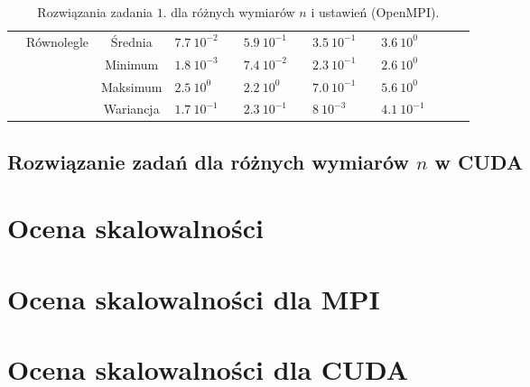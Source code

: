 \documentclass[11pt, a4paper, oneside]{article}
\begin{document}
\begin{table}[t]
\begin{adjustwidth}{-1.76cm}{}
\begin{tabular}{|c|c|c|l|l|l|l|l|l|l|l|l|l|}
                      & \multirow{4}{*}{Równolegle}   & Średnia   & $7.7 \ 10^{-2}$          &                         & $5.9 \ 10^{-1}$          &                         & $3.5 \ 10^{-1}$          &                         & $3.6 \ 10^{0}$           &                         &                          &                         \\ \cline{3-13} 
                      &                               & Minimum   & $1.8 \ 10^{-3}$          &                         & $7.4 \ 10^{-2}$          &                         & $2.3 \ 10^{-1}$          &                         & $2.6 \ 10^{0}$           &                         &                          &                         \\ \cline{3-13} 
                      &                               & Maksimum  & $2.5 \ 10^{0}$           &                         & $2.2 \ 10^{0}$           &                         & $7.0 \ 10^{-1}$          &                         & $5.6 \ 10^{0}$           &                         &                          &                         \\ \cline{3-13} 
                      &                               & Wariancja & $1.7 \ 10^{-1}$          &                         & $2.3 \ 10^{-1}$          &                         & $8 \ 10^{-3}$            &                         & $4.1 \ 10^{-1}$          &                         &                          &                         \\ \hline
\end{tabular}
\end{adjustwidth}
\caption{Rozwiązania zadania $1$. dla różnych wymiarów $n$ i ustawień (OpenMPI).}
\label{tab:MPI:zad_1}
\end{table}

\subsection{Rozwiązanie zadań dla różnych wymiarów $n$ w CUDA}

\section{Ocena skalowalności}

\section{Ocena skalowalności dla MPI}

\section{Ocena skalowalności dla CUDA}
\end{document}
